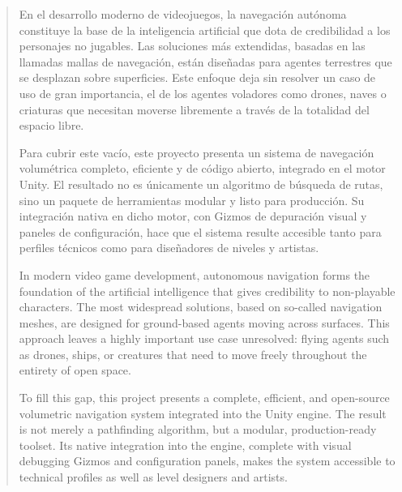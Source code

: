 
\pagestyle{empty}
\begin{abstract}
  En el desarrollo moderno de videojuegos, la navegación autónoma constituye la base de la inteligencia artificial que dota de credibilidad a los personajes no jugables.
  Las soluciones más extendidas, basadas en las llamadas mallas de navegación, están diseñadas para agentes terrestres que se desplazan sobre superficies.
  Este enfoque deja sin resolver un caso de uso de gran importancia, el de los agentes voladores como drones, naves o criaturas que necesitan moverse libremente a través de la totalidad del espacio libre.

  Para cubrir este vacío, este proyecto presenta un sistema de navegación volumétrica completo, eficiente y de código abierto, integrado en el motor Unity.
  El resultado no es únicamente un algoritmo de búsqueda de rutas, sino un paquete de herramientas modular y listo para producción.
  Su integración nativa en dicho motor, con Gizmos de depuración visual y paneles de configuración, hace que el sistema resulte accesible tanto para perfiles técnicos como para diseñadores de niveles y artistas.
  
  \vspace*{25pt}

  \begin{segundoresumo}
  In modern video game development, autonomous navigation forms the foundation of the artificial intelligence that gives credibility to non-playable characters.
  The most widespread solutions, based on so-called navigation meshes, are designed for ground-based agents moving across surfaces.
  This approach leaves a highly important use case unresolved: flying agents such as drones, ships, or creatures that need to move freely throughout the entirety of open space.

  To fill this gap, this project presents a complete, efficient, and open-source volumetric navigation system integrated into the Unity engine.
  The result is not merely a pathfinding algorithm, but a modular, production-ready toolset.
  Its native integration into the engine, complete with visual debugging Gizmos and configuration panels, makes the system accessible to technical profiles as well as level designers and artists.

  \end{segundoresumo}
\vspace*{25pt}

\end{abstract}
\pagestyle{fancy}

